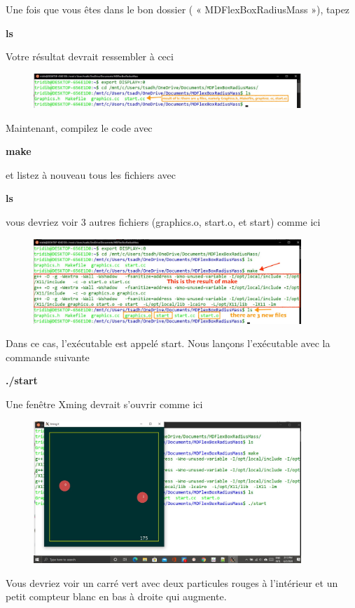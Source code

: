 \documentclass{article}
\begin{document}
Une fois que vous êtes dans le bon dossier ( « MDFlexBoxRadiusMass »), tapez
\begin{tcolorbox}[width=\textwidth,colframe=BurntOrange,colback={black},title={ubuntu terminal},outer arc=0mm,colupper=white]  
    \large\textbf{  ls }
\end{tcolorbox}
Votre résultat devrait ressembler à ceci
\begin{figure}[H]
\center
\includegraphics[width=0.9\textwidth]{Plots/MD_2CD.jpeg}
\end{figure}
Maintenant, compilez le code avec
\begin{tcolorbox}[width=\textwidth,colframe=BurntOrange,colback={black},title={ubuntu terminal},outer arc=0mm,colupper=white]  
    \large\textbf{  make }
\end{tcolorbox}
et listez à nouveau tous les fichiers avec
\begin{tcolorbox}[width=\textwidth,colframe=BurntOrange,colback={black},title={ubuntu terminal},outer arc=0mm,colupper=white]  
    \large\textbf{  ls }
\end{tcolorbox}
vous devriez voir 3 autres fichiers (graphics.o, start.o, et start) comme ici
\begin{figure}[H]
\center
\includegraphics[width=0.9\textwidth]{Plots/MD_3Make.jpeg}
\end{figure}
Dans ce cas, l'exécutable est appelé start. Nous lançons l'exécutable avec la commande suivante
\begin{tcolorbox}[width=\textwidth,colframe=BurntOrange,colback={black},title={ubuntu terminal},outer arc=0mm,colupper=white]  
    \large\textbf{  ./start }
\end{tcolorbox}
Une fenêtre Xming devrait s'ouvrir comme ici
\begin{figure}[H]
\center
\includegraphics[width=0.9\textwidth]{Plots/MD_4XMing.jpeg}
\end{figure}
Vous devriez voir un carré vert avec deux particules rouges à l'intérieur et un petit compteur blanc en bas à droite qui augmente.
\end{document}

